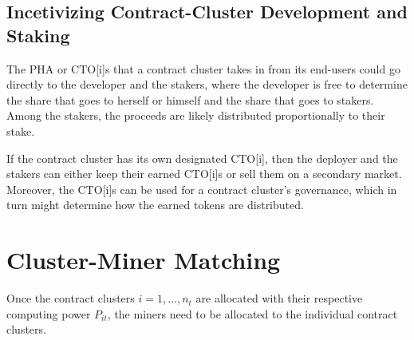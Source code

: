 \documentclass[11pt, a4paper, twocolumn]{article}
\begin{document}

\subsection{Incetivizing Contract-Cluster Development and Staking}
\label{subsec:incentives}

The PHA or CTO[i]s that a contract cluster takes in from its end-users could go directly to the developer and the stakers, where the developer is free to determine the share that goes to herself or himself and the share that goes to stakers. Among the stakers, the proceeds are likely distributed proportionally to their stake. 

If the contract cluster has its own designated CTO[i], then the deployer and the stakers can either keep their earned CTO[i]s or sell them on a secondary market. Moreover, the CTO[i]s can be used for a contract cluster's governance, which in turn might determine how the earned tokens are distributed.


\section{Cluster-Miner Matching}\label{sec:matching}
Once the contract clusters $i = 1,...,n_t$ are allocated with their respective computing power $P_{it}$, the miners need to be allocated to the individual contract clusters. 
\end{document}
